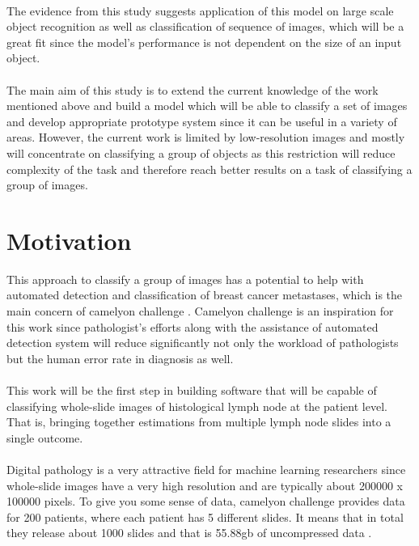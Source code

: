  \paragraph{} The evidence from this study suggests application of this model on large scale
 object recognition as well as classification of sequence of images, which will
 be a great fit since the model's performance is not dependent on the size of an input object.

 \paragraph{} The main aim of this study is to extend the current knowledge of the work mentioned above and build a model which will be able to classify a set of images and develop appropriate prototype system since it can be useful in a variety of areas. However, the current work is limited by low-resolution images and mostly will concentrate on classifying a group of objects as this restriction will reduce complexity of the task and therefore reach better results on a task of classifying a group of images.

\section{Motivation}
This approach to classify a group of images has a potential to help with automated
detection and classification of breast cancer metastases, which is the main concern
of camelyon challenge \cite{CAMEL}.
Camelyon challenge is an inspiration for this work since pathologist's efforts
along with the assistance of automated detection system will reduce significantly
not only the workload of pathologists but the human error rate in diagnosis as well.

\paragraph{}
This work will be the first step in building software that will be capable of
classifying whole-slide images of histological lymph node at the patient level.
That is, bringing together estimations from multiple lymph node slides into a single outcome.

\paragraph{}
Digital pathology is a very attractive field for machine learning researchers
since whole-slide images have a very high resolution and are typically about 200000 x 100000 pixels.
To give you some sense of data, camelyon challenge provides data for 200 patients,
where each patient has 5 different slides. It means that in total they release
about 1000 slides and that is 55.88gb of uncompressed data \cite{CAMEL}.

